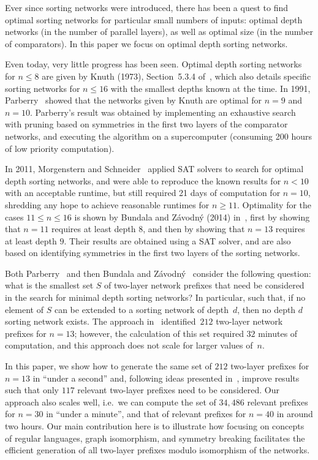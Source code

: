 \documentclass[10pt]{IEEEtran}
\begin{document}
Ever since sorting networks were introduced, there has been a quest to
find optimal sorting networks for particular small numbers of inputs:
optimal depth networks (in the number of parallel layers), as well as
optimal size (in the number of comparators). In this paper we focus on
optimal depth sorting networks.

Even today, very little progress has been seen.
Optimal depth sorting networks for $n\leq 8$ are given by Knuth (1973),
Section~5.3.4 of~\cite{Knuth73}, which also details specific sorting
networks for $n\leq 16$ with the smallest depths known at the time. In
1991, Parberry~\cite{DBLP:journals/mst/Parberry91} showed that the
networks given by Knuth are optimal for $n = 9$ and $n = 10$.
Parberry's result was obtained by implementing an exhaustive
search with pruning based on symmetries in the first two layers of the
comparator networks, and executing the algorithm on a supercomputer
(consuming 200 hours of low priority computation).

In 2011, Morgenstern and Schneider~\cite{DBLP:conf/mbmv/MorgensternS11} applied
SAT solvers to search for optimal depth sorting networks, and were
able to reproduce the known results for $n<10$ with an acceptable
runtime, but still required 21 days of computation for
$n=10$, shredding any hope to achieve reasonable runtimes for $n \geq 11$.
Optimality for the cases $11\leq n\leq 16$ is shown by Bundala and
Z{\'a}vodn{\'y} (2014) in~\cite{DBLP:conf/lata/BundalaZ14}, first by
showing that $n=11$ requires at least depth $8$, and then by showing
that $n=13$ requires at least depth $9$. Their results are obtained
using a SAT solver, and are also based on identifying symmetries in
the first two layers of the sorting networks.

Both Parberry~\cite{DBLP:journals/mst/Parberry91} and then Bundala and
Z{\'a}vodn{\'y}~\cite{DBLP:conf/lata/BundalaZ14} consider the
following question: what is the smallest set $S$ of two-layer network
prefixes that need be considered in the search for minimal depth
sorting networks? In particular, such that, if no element of $S$ can be
extended to a sorting network of depth~$d$, then no depth $d$ sorting
network exists.
The approach
in~\cite{DBLP:conf/lata/BundalaZ14}
\linebreak
identified~$212$ two-layer network prefixes for $n=13$; however, the
calculation of this set required $32$ minutes of computation, and this
approach does not scale for larger values of~$n$.


In this paper, we show how to generate the same set of $212$ two-layer
prefixes for $n=13$ in ``under a second'' and,
following ideas presented in~\cite{DBLP:conf/lata/BundalaZ14},
improve results such that
only $117$ relevant two-layer prefixes need to be considered. Our approach also scales
well, i.e.\ we can compute the set of $34{,}486$ relevant prefixes
for $n=30$ in ``under a minute'', and that of relevant prefixes for
$n=40$ in around two hours.  Our main contribution here is to
illustrate how focusing on concepts of regular languages, graph
isomorphism, and symmetry breaking facilitates the efficient generation
of all two-layer prefixes modulo isomorphism of the networks.
\end{document}
